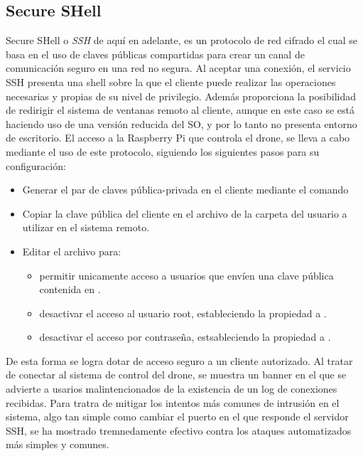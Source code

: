 \subsection{Secure SHell}
\label{subsec:ssh}
Secure SHell o \textit{SSH} de aquí en adelante, es un protocolo de red cifrado el cual se basa en el uso de claves públicas compartidas para crear un canal de comunicación seguro en una red no segura. Al aceptar una conexión, el servicio SSH presenta una shell sobre la que el cliente puede realizar las operaciones necesarias y propias de su nivel de privilegio. Además proporciona la posibilidad de redirigir el sistema de ventanas remoto al cliente, aunque en este caso se está haciendo uso de una versión reducida del SO, y por lo tanto no presenta entorno de escritorio. El acceso a la Raspberry Pi que controla el drone, se lleva a cabo mediante el uso de este protocolo, siguiendo los siguientes pasos para su configuración:
\begin{itemize}
\item Generar el par de claves pública-privada en el cliente mediante el comando 
\item Copiar la clave pública del cliente en el archivo  de la carpeta  del usuario a utilizar en el sistema remoto.
\item Editar el archivo  para:
	\begin{itemize}
	\item permitir unicamente acceso a usuarios que envíen una clave pública contenida en .
	\item desactivar el acceso al usuario root, estableciendo la propiedad  a .
	\item desactivar el acceso por contraseña, estsableciendo la propiedad  a .
	\end{itemize}	 
\end{itemize} 

De esta forma se logra dotar de acceso seguro a un cliente autorizado. Al tratar de conectar al sistema de control del drone, se muestra un banner en el que se advierte a usarios malintencionados de la existencia de un log de conexiones recibidas. 
Para tratra de mitigar los intentos más comunes de intrusión en el sistema, algo tan simple como cambiar el puerto en el que responde el servidor SSH, se ha mostrado tremnedamente efectivo contra los ataques automatizados más simples y comunes.



